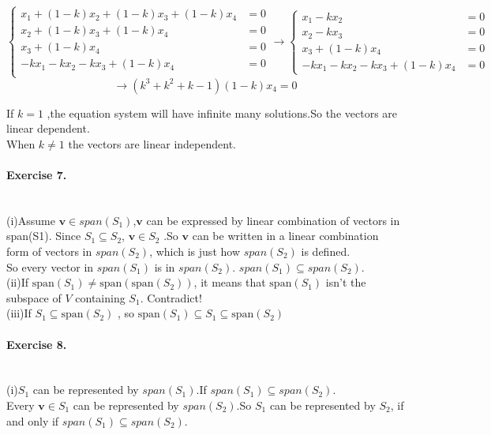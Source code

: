 \documentclass{article}
\begin{document}
  \[
    \left\{
      \begin{align}
      x_1+(1-k)x_2+(1-k)x_3+(1-k)x_4&=0\\
      x_2+(1-k)x_3+(1-k)x_4&=0\\
      x_3+(1-k)x_4&=0\\
      -kx_1-kx_2-kx_3+(1-k)x_4&=0\\
      \end{align}\right.
      \rightarrow
      \left\{
      \begin{align}
      x_1-kx_2&=0\\
      x_2-kx_3&=0\\
      x_3+(1-k)x_4&=0\\
      -kx_1-kx_2-kx_3+(1-k)x_4&=0
      \end{align}\right.
\]
\[
\rightarrow
(k^3+k^2+k-1)(1-k)x_4=0
\]

If $k=1$ ,the equation system will have infinite many solutions.So the vectors are linear dependent.\\

When $k \neq 1$ the vectors are linear independent.
\paragraph{Exercise 7.}\\

(i)Assume $ \mathbf{v} \in span(S_1)$,$\mathbf{v}$ can be expressed by linear combination of vectors in span(S1). Since $S_1 \subseteq S_2$, $ \mathbf{v} \in S_2$ .So $\mathbf{v}$ can be written in a linear combination form of vectors in $span(S_2)$, which is just how $span(S_2)$ is defined.\\
So every vector in $span(S_1)$ is in $span(S_2)$. $ span(S_1) \subseteq span(S_2) $.\\

(ii)If $\text{span}(S_1) \neq \text{span}(\text{span}(S_2))$, it means that $\text{span}(S_1)$ isn't the  subspace of $V$ containing $S_1$. Contradict!\\

(iii)If $S_1 \subseteq \text{span}(S_2)$ , so $\text{span}(S_1) \subseteq S_1 \subseteq \text{span}(S_2)$

\paragraph{Exercise 8.}\\

  (i)$S_1$ can be represented by $span(S_1)$.If $ span(S_1) \subseteq span(S_2)$.\\Every $\mathbf{v}\in S_1$ can be represented by $span(S_2)$.So $S_1$ can be represented by $S_2$, if and only if  $ span(S_1) \subseteq span(S_2)$.\\
\end{document}
